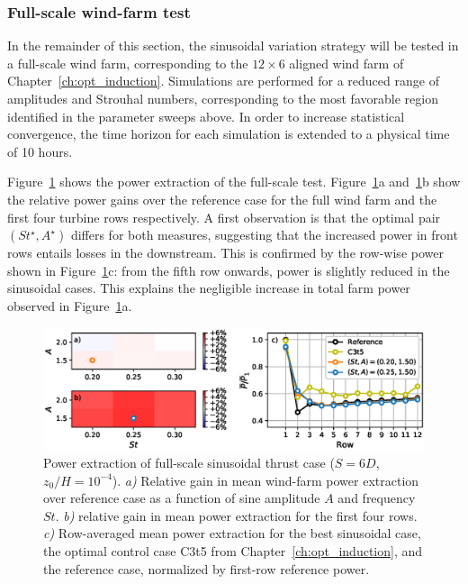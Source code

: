 \subsubsection{Full-scale wind-farm test}
In the remainder of this section, the sinusoidal variation strategy will be tested in a full-scale wind farm, corresponding to the $12 \times 6$ aligned wind farm of Chapter~\ref{ch:opt_induction}. Simulations are performed for a reduced range of amplitudes and Strouhal numbers, corresponding to the most favorable region identified in the parameter sweeps above. In order to increase statistical convergence, the time horizon for each simulation is extended to a physical time of 10 hours. 

Figure~\ref{fig:sinus_fullscale} shows the power extraction of the full-scale test. Figure~\ref{fig:sinus_fullscale}a and~\ref{fig:sinus_fullscale}b show the relative power gains over the reference case for the full wind farm and the first four turbine rows respectively. A first observation is that the optimal pair $(St^\star, A^\star)$ differs for both measures, suggesting that the increased power in front rows entails losses in the downstream. This is confirmed by the row-wise power shown in Figure~\ref{fig:sinus_fullscale}c: from the fifth row onwards, power is slightly reduced in the sinusoidal cases. This explains the negligible increase in total farm power observed in Figure~\ref{fig:sinus_fullscale}a. 

\begin{figure}
	\centering
	\includegraphics[width=\textwidth]{chapters/analysis_induction_control/gains_fullscale.eps}
	\caption[Power extraction of full-scale sinusoidal thrust case ($S = 6D$, $z_0/H = 10^{-4}$).]{Power extraction of full-scale sinusoidal thrust case ($S = 6D$, $z_0/H = 10^{-4}$). \emph{a) } Relative gain in mean wind-farm power extraction over reference case as a function of sine amplitude $A$ and frequency $St$. \emph{b) } relative gain in mean power extraction for the first four rows. \emph{c) } Row-averaged mean power extraction for the best sinusoidal case, the optimal control case C3t5 from Chapter~\ref{ch:opt_induction}, and the reference case, normalized by first-row reference power.\label{fig:sinus_fullscale} }
\end{figure}

